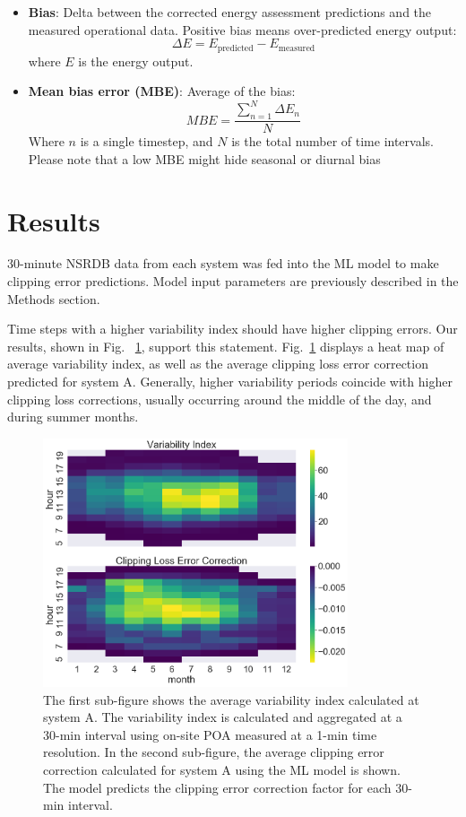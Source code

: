 \documentclass[conference]{IEEEtran}
\begin{document}
\begin{itemize}
\item \textbf{Bias}: Delta between the corrected energy assessment predictions and the measured operational data. Positive bias means over-predicted energy output:
\begin{equation}
\Delta E={E_\text{predicted}} - {E_\text{measured}}\label{eq:bias}
\end{equation}
where $E$ is the energy output.
\item \textbf{Mean bias error (MBE)}: Average of the bias:
\begin{equation}
\mathit{MBE}=\frac{\sum_{n=1}^N{\Delta E_n}}{N}\label{eq:mbe}
\end{equation}
Where $n$ is a single timestep, and $N$ is the total number of time intervals. Please note that a low MBE might hide seasonal or diurnal bias
\end{itemize}


\section{Results}

30-minute NSRDB data from each system was fed into the ML model to make clipping error predictions. Model input parameters are previously described in the Methods section.

Time steps with a higher variability index should have higher clipping errors. Our results, shown in Fig. ~\ref{fig:DCS-vi-clec-heatmap}, support this statement. Fig.~\ref{fig:DCS-vi-clec-heatmap} displays a heat map of average variability index, as well as the average clipping loss error correction predicted for system A. Generally, higher variability periods coincide with higher clipping loss corrections, usually occurring around the middle of the day, and during summer months.

\begin{figure}[htbp]
\centerline{\includegraphics[width=9cm]{DCS_VI_CLEC_heatmap.png}}
\caption{The first sub-figure shows the average variability index calculated at system A. The variability index is calculated and aggregated at a 30-min interval using on-site POA measured at a 1-min time resolution. In the second sub-figure, the average clipping error correction calculated for system A using the ML model is shown. The model predicts the clipping error correction factor for each 30-min interval.}
\label{fig:DCS-vi-clec-heatmap}
\end{figure}
\end{document}
